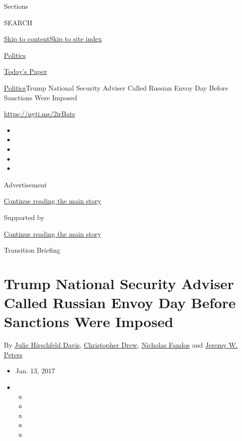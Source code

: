 Sections

SEARCH

\protect\hyperlink{site-content}{Skip to
content}\protect\hyperlink{site-index}{Skip to site index}

\href{https://www.nytimes.com/section/politics}{Politics}

\href{https://myaccount.nytimes.com/auth/login?response_type=cookie\&client_id=vi}{}

\href{https://www.nytimes.com/section/todayspaper}{Today's Paper}

\href{/section/politics}{Politics}\textbar{}Trump National Security
Adviser Called Russian Envoy Day Before Sanctions Were Imposed

\url{https://nyti.ms/2irBats}

\begin{itemize}
\item
\item
\item
\item
\item
\end{itemize}

Advertisement

\protect\hyperlink{after-top}{Continue reading the main story}

Supported by

\protect\hyperlink{after-sponsor}{Continue reading the main story}

Transition Briefing

\hypertarget{trump-national-security-adviser-called-russian-envoy-day-before-sanctions-were-imposed}{%
\section{Trump National Security Adviser Called Russian Envoy Day Before
Sanctions Were
Imposed}\label{trump-national-security-adviser-called-russian-envoy-day-before-sanctions-were-imposed}}

By \href{https://www.nytimes.com/by/julie-hirschfeld-davis}{Julie
Hirschfeld Davis},
\href{http://www.nytimes.com/by/christopher-drew}{Christopher Drew},
\href{https://www.nytimes.com/by/nicholas-fandos}{Nicholas Fandos} and
\href{http://www.nytimes.com/by/jeremy-w-peters}{Jeremy W. Peters}

\begin{itemize}
\item
  Jan. 13, 2017
\item
  \begin{itemize}
  \item
  \item
  \item
  \item
  \item
  \end{itemize}
\end{itemize}

